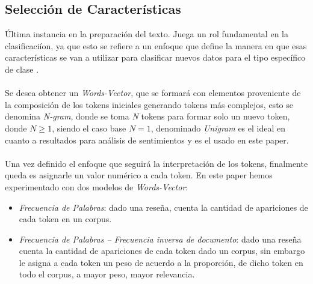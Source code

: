\documentclass{sciposter}
\begin{document}
\begin{multicols}{3}
\subsection{Selecci\'on de Caracter\'isticas}
\'Ultima instancia en la preparaci\'on del texto. Juega un rol fundamental en la clasificaci\'ion, ya que esto se refiere a un enfoque que define la manera en que esas caracter\'isticas se van a utilizar para clasificar nuevos datos para el tipo específico de clase \cite{Parmar:Bhanderi:Shah:2014}.
\\\\
Se desea obtener un \emph{Words-Vector}, que se formar\'a con elementos proveniente de la composici\'on de los tokens iniciales generando tokens m\'as complejos, esto se denomina \emph{N-gram}, donde se toma \emph{N} tokens para formar solo un nuevo token, donde $N \geq 1$, siendo el caso base $N = 1$, denominado \emph{Unigram} es el ideal en cuanto a resultados para an\'alisis de sentimientos y es el usado en este paper.
\\\\
Una vez definido el enfoque que seguir\'a la interpretaci\'on de los tokens, finalmente queda es asignarle un valor num\'erico a cada token. En este paper hemos experimentado con dos modelos de \emph{Words-Vector}:
\begin{itemize}
\item \emph{Frecuencia de Palabras}: dado una reseña, cuenta la cantidad de apariciones de cada token en un corpus.
\item \emph{Frecuencia de Palabras -- Frecuencia inversa de documento}: dado una reseña cuenta la cantidad de apariciones de cada token dado un corpus, sin embargo le asigna a cada token un peso de acuerdo a la proporci\'on, de dicho token en todo el corpus, a mayor peso, mayor relevancia. 
\end{itemize}


\end{multicols}
\end{document}
